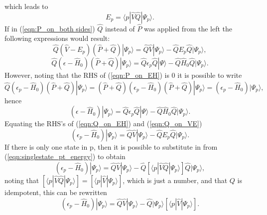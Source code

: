 which leads to 
\begin{equation}
E_{p} = \langle p | \hat{V}\hat{Q}|\Psi_{p} \rangle.
\label{eqn:singlestate_pt_energy}
\end{equation}
If in (\ref{eqn:P_on_both sides}) $\hat{Q}$ instead of $\hat{P}$ was applied from the left the following expressions would result:
\begin{equation}
\hat{Q}(\hat{V}-E_{p})(\hat{P}+\hat{Q})|\Psi_{p} \rangle = \hat{Q}\hat{V}|\Psi_{p} \rangle - \hat{Q}E_{p}\hat{Q}|\Psi_{p}\rangle ,
\label{eqn:Q_on_VE}
\end{equation}
\begin{equation}
\hat{Q}(\epsilon - \hat{H}_{0})(\hat{P}+\hat{Q})| \Psi_{p} \rangle  = \hat{Q}\epsilon_{p}\hat{Q}|\Psi\rangle- \hat{Q}\hat{H}_{0}\hat{Q}|\Psi_{p}\rangle.
\end{equation}
However, noting that the RHS of (\ref{eqn:P_on_EH}) is $0$ it is possible to write
\begin{equation*}
\hat{Q}(\epsilon_{p} - \hat{H}_{0})(\hat{P}+\hat{Q})| \Psi_{p} \rangle =
(\hat{P} + \hat{Q})(\epsilon_{p} - \hat{H}_{0})(\hat{P}+\hat{Q})| \Psi_{p} \rangle =
(\epsilon_{p} - \hat{H}_{0})| \Psi_{p} \rangle ,
\end{equation*}
hence
\begin{equation}
(\epsilon - \hat{H}_{0})| \Psi_{p} \rangle  = \hat{Q}\epsilon_{p}\hat{Q}|\Psi\rangle- \hat{Q}\hat{H}_{0}\hat{Q}|\Psi_{p}\rangle.
\label{eqn:Q_on_EH} 
\end{equation}
Equating the RHS's of (\ref{eqn:Q_on_EH}) and (\ref{eqn:Q_on_VE})
 \begin{equation*}
(\epsilon_{p} - \hat{H}_{0})|\Psi_{p}\rangle
= \hat{Q}\hat{V}|\Psi_{p} \rangle - \hat{Q}E_{p}\hat{Q}|\Psi_{p}\rangle .
\end{equation*}
If there is only one state in $\mathrm{p}$, then it is possible to substitute in from  (\ref{eqn:singlestate_pt_energy}) to obtain
\begin{equation*}
( \epsilon_{p}- \hat{H}_{0} )|\Psi_{p}\rangle = 
\hat{Q}\hat{V}|\Psi_{p} \rangle - \hat{Q}[\langle p | \hat{V}\hat{Q}|\Psi_{p} \rangle] \hat{Q}|\Psi_{p}\rangle, 
\end{equation*}
noting that  $[\langle p | \hat{V}\hat{Q}|\Psi_{p} \rangle] = [\langle p | \hat{V} |\Psi_{p} \rangle]$, which
is just a number, and that $Q$ is idempotent, this can be rewritten
\begin{equation}
( \epsilon_{p}- \hat{H}_{0} )|\Psi_{p}\rangle = 
\hat{Q}\hat{V}|\Psi_{p} \rangle -  \hat{Q}|\Psi_{p}\rangle[\langle p | \hat{V} |\Psi_{p} \rangle]. 
\label{eqn:Q_on_both_sides_singlestate}
\end{equation}
